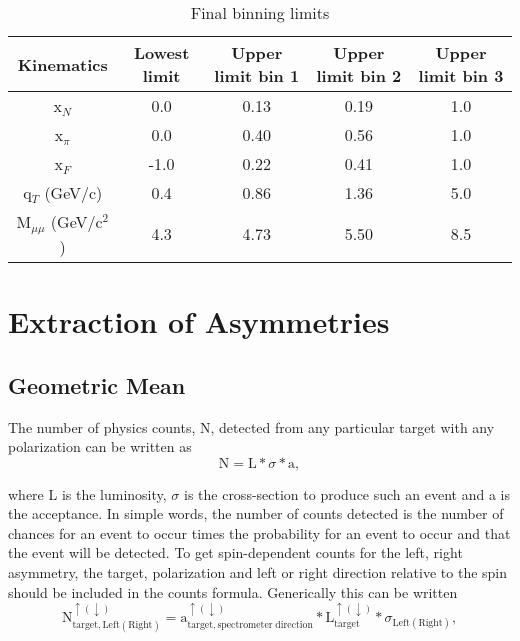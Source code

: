 \begin{table}[h!t]
  \centering
  \begin{tabular}{ |c|c|c|c|c| }
    \hline \textbf{Kinematics}& \textbf{Lowest limit}& \textbf{Upper limit bin
      1}& \textbf{Upper limit bin 2}& \textbf{Upper limit bin 3}\\ \hline
    
    x$_N$& 0.0& 0.13& 0.19& 1.0\\ \hline x$_{\pi}$& 0.0& 0.40& 0.56&
    1.0\\ \hline x$_F$& -1.0& 0.22& 0.41& 1.0\\ \hline q$_T$ (GeV/c)& 0.4& 0.86&
    1.36& 5.0\\ \hline M$_{\mu\mu}$ (GeV/c$^2$)& 4.3& 4.73& 5.50& 8.5 \\ \hline
    
  \end{tabular}
  \caption{Final binning limits}
  \label{tab::binning}
\end{table}


\section{Extraction of Asymmetries} 

\subsection{Geometric Mean} \label{sec::GeoMean}
The number of physics counts, N, detected from any particular target with any
polarization can be written as
\begin{equation}
\mathrm{N} = \mathrm{L} * \sigma * \mathrm{a},
\end{equation}

\noindent
where L is the luminosity, $\sigma$ is the cross-section to produce such an
event and a is the acceptance.  In simple words, the number of counts detected
is the number of chances for an event to occur times the probability for an
event to occur and that the event will be detected.  To get spin-dependent
counts for the left, right asymmetry, the target, polarization and left or right
direction relative to the spin should be included in the counts formula.
Generically this can be written
\begin{equation}
  \label{eqn::indexedCount}
\mathrm{N}^{\uparrow(\downarrow)}_{\mathrm{target},\mathrm{Left(Right)}} =
\mathrm{a}^{\uparrow(\downarrow)}_{\mathrm{target},\mathrm{spectrometer \;
    direction}} * \mathrm{L}^{\uparrow(\downarrow)}_{\mathrm{target}} *
\sigma_{\mathrm{Left(Right)}},
\end{equation}

